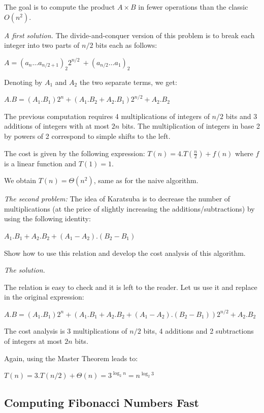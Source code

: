 The goal is to compute the product $A \times B$ in fewer operations than the classic $O(n^2)$.
\medskip

\noindent \textit{A first solution.}
The divide-and-conquer version of this problem is to break each integer into two parts
of $n/2$ bits each as follows:

$A=(a_n\ldots a_{n/2+1})_2 2^{n/2}\ + (a_{n/2}\ldots a_1)_2$

Denoting by $A_1$ and $A_2$ the two separate terms, we get:

$A.B = (A_1.B_1) 2^n + (A_1.B_2 + A_2.B_1) 2^{n/2} + A_2.B_2$
\medskip

The previous computation requires 4 multiplications of integers of $n/2$ bits 
and 3 additions of integers with at most $2n$ bits. The multiplication of integers in base 2 by powers of 2 
correspond to simple shifts to the left. 

The cost is given by the following expression: $T(n) = 4.T(\frac{n}{2}) + f(n)$ where $f$ is a linear function
and $T(1) = 1$.

We obtain $T(n) = \Theta(n^2)$, same as for the naive algorithm.
\bigskip
 
\noindent \textit{The second problem:}
The idea of Karatsuba is to decrease the number of multiplications 
(at the price of slightly increasing the additions/subtractions) by using the following identity:

$A_1.B_1 + A_2.B_2 + (A_1-A_2).(B_2-B_1)$

Show how to use this relation and develop the cost analysis of this algorithm.
\medskip

\noindent \textit{The solution.}

The relation is easy to check and it is left to the reader. 
Let us use it and replace in the original expression:

$A.B = (A_1.B_1) 2^n + (A_1.B_1 + A_2.B_2 + (A_1-A_2).(B_2-B_1)) 2^{n/2} + A_2.B_2$

The cost analysis is 3 multiplications of $n/2$ bits,
4 additions and 2 subtractions of integers at most $2n$ bits. 

Again, using the Master Theorem leads to:

$T(n) = 3.T(n/2) + \Theta (n) = 3^{\log_2 n} = n^{\log_2 3}$



\subsection{Computing Fibonacci Numbers Fast}
\label{sec:FastFibo}

